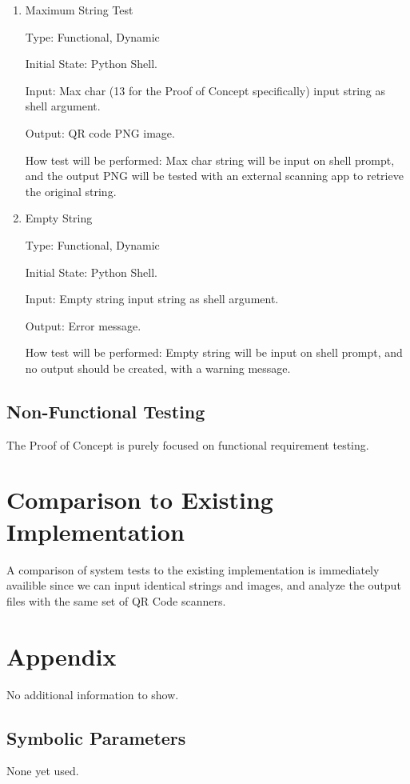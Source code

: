 \documentclass[12pt, titlepage]{article}
\begin{document}
\begin{enumerate}

\item{Maximum String Test\\}

Type: Functional, Dynamic
					
Initial State: Python Shell.
					
Input: Max char (13 for the Proof of Concept specifically) input string as shell argument.
					
Output: QR code PNG image.
					
How test will be performed: Max char string will be input on shell prompt, and the output PNG will be tested with an external scanning app to retrieve the original string.
					
\item{Empty String\\}

Type: Functional, Dynamic
					
Initial State: Python Shell.
					
Input: Empty string input string as shell argument.
					
Output: Error message.
					
How test will be performed: Empty string will be input on shell prompt, and no output should be created, with a warning message.

\end{enumerate}

\subsection{Non-Functional Testing}

The Proof of Concept is purely focused on functional requirement testing.
	
\section{Comparison to Existing Implementation}	

A comparison of system tests to the existing implementation is immediately availible since we can input identical strings and images, and analyze the output files with the same set of QR Code scanners.





\newpage

\section{Appendix}

No additional information to show.

\subsection{Symbolic Parameters}

None yet used.
\end{document}
